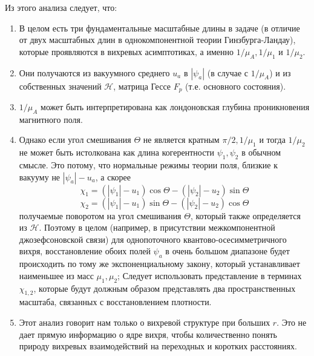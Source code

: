 Из этого анализа следует, что:
\begin{enumerate}
    \item В целом есть три фундаментальные масштабные длины в задаче (в 
        отличие от двух масштабных длин в однокомпонентной теории 
        Гинзбурга-Ландау), которые проявляются в вихревых асимптотиках, а 
        именно \( 1/\mu_A, 1/\mu_1 \) и \( 1/\mu_2 \).
    \item Они получаются из вакуумного среднего \( u_a \) в \( |\psi_a| \) 
        (в случае с \( 1/\mu_A \)) и из собственных значений 
        \( \mathcal{H} \), матрица Гессе \( F_p \) (т.е. основного состояния).
    \item \( 1/\mu_{A} \) может быть интерпретирована как лондоновская глубина 
        проникновения магнитного поля.
    \item Однако если угол смешивания \( \Theta \) не является кратным  
        \( \pi/2, 1/\mu_1 \) и тогда \( 1/\mu_2 \) не может быть истолкована 
        как длина когерентности \( \psi_1, \psi_2 \) в обычном смысле. Это 
        потому, что нормальные режимы теории поля, близкие к вакууму не 
        \( |\psi_a| - u_a \), а скорее
        \[ 
            \chi_1 = (|\psi_1| - u_1)\cos\Theta - (|\psi_2| - u_2)\sin\Theta 
        \]
        \[ 
            \chi_2 = (|\psi_1| - u_1)\sin\Theta - (|\psi_2| - u_2)\cos\Theta 
        \]
        получаемые поворотом на угол смешивания \( \Theta \), который также 
        определяется из \( \mathcal{H} \). Поэтому в целом (например, в 
        присутствии межкомпонентной джозефсоновской связи) для однопоточного
        квантово-осесимметричного вихря, восстановление обоих полей
        \( \psi_a \) в очень большом диапазоне будет происходить по тому же 
        экспоненциальному закону, который устанавливает наименьшее из масс 
        \( \mu_1, \mu_2 \); Следует использовать представление в терминах 
        \( \chi_{1,2} \), которые будут должным образом представлять два 
        пространственных масштаба, связанных с восстановлением плотности.
    \item Этот анализ говорит нам только о вихревой структуре при больших
        \( r \). Это не дает прямую информацию о ядре вихря, чтобы 
        количественно понять природу вихревых взаимодействий на переходных 
        и коротких расстояниях.
\end{enumerate}

